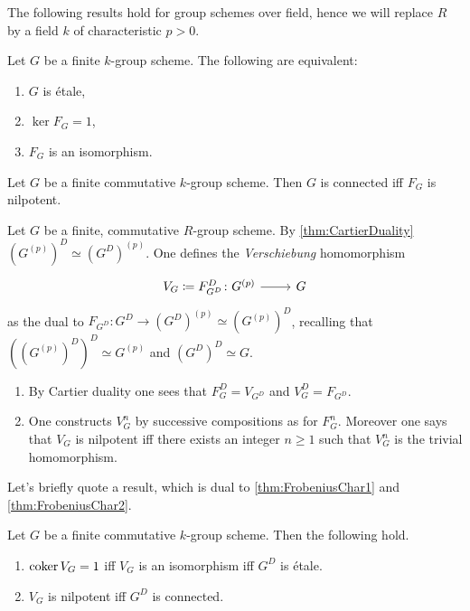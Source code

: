 \noindent
The following results hold for group schemes over field, hence we will replace
$R$ by a field $k$ of characteristic $p > 0$.
\begin{prop}[]\label{thm:FrobeniusChar1}
	Let $G$ be a finite $k$-group scheme.
	The following are equivalent:
\begin{enumerate}
	\item $G$ is étale,
	\item $\ker F_G = 1$,
	\item $F_G$ is an isomorphism.
\end{enumerate}
\end{prop}


\begin{prop}[]\label{thm:FrobeniusChar2}
	Let $G$ be a finite commutative $k$-group scheme.
	Then $G$ is connected iff $F_G$ is nilpotent.
\end{prop}


\begin{defn}[Verschiebung]
	Let $G$ be a finite, commutative $R$-group scheme.
	By \cref{thm:CartierDuality} $(G^{(p)})^D \simeq (G^D)^{(p)}$.
	One defines the {\em Verschiebung} homomorphism
	\begin{equation}
	\begin{tikzcd}[row sep = 0ex
		,/tikz/column 1/.append style={anchor=base east}
		,/tikz/column 2/.append style={anchor=base west}]
		V_G \coloneqq F^D_{G^D}\colon G^{(p)} \arrow[r, "", rightarrow] &
		G
	\end{tikzcd}
	\end{equation} 
	as the dual to $F_{G^D}\colon G^D \to (G^D)^{(p)} \simeq (G^{(p)})^D$,
	recalling that $((G^{(p)})^D)^D \simeq G^{(p)}$ and $(G^D)^D \simeq G$.
\end{defn}


\begin{rem}[]\leavevmode\vspace{-.2\baselineskip}
\begin{enumerate}
\item By Cartier duality one sees that $F^D_G = V_{G^D}$ and
	$V^D_G = F_{G^D}$.
\item One constructs $V^n_G$ by successive compositions as for $F^n_G$.
	Moreover one says that $V_G$ is nilpotent iff there exists an integer $n \geq 1$
	such that $V^n_G$ is the trivial homomorphism.
\end{enumerate}
\end{rem}


\noindent
Let's briefly quote a result, which is dual to
\cref{thm:FrobeniusChar1} and \cref{thm:FrobeniusChar2}.
\begin{prop}[]
	Let $G$ be a finite commutative $k$-group scheme. Then the following hold.
\begin{enumerate}
	\item $\operatorname{coker} V_G = 1$ iff $V_G$ is an isomorphism iff
		$G^D$ is étale.
	\item $V_G$ is nilpotent iff $G^D$ is connected.
\end{enumerate}
\end{prop}


